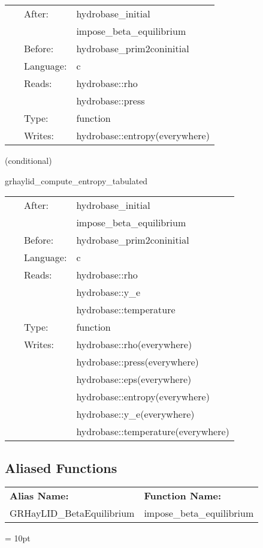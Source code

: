\hspace{5mm}{\it computes entropy from density and pressure using hybrid eos } 


\hspace{5mm}

 \begin{tabular*}{160mm}{cll} 
~ & After:  & hydrobase\_initial \\ 
~& ~ &impose\_beta\_equilibrium\\ 
~ & Before:  & hydrobase\_prim2coninitial \\ 
~ & Language:  & c \\ 
~ & Reads:  & hydrobase::rho \\ 
~& ~ &hydrobase::press\\ 
~ & Type:  & function \\ 
~ & Writes:  & hydrobase::entropy(everywhere) \\ 
\end{tabular*} 


\vspace{5mm}

   (conditional) 

\hspace{5mm} grhaylid\_compute\_entropy\_tabulated 

\hspace{5mm}{\it computes entropy from density, y\_e, and temperature using tabulated eos } 


\hspace{5mm}

 \begin{tabular*}{160mm}{cll} 
~ & After:  & hydrobase\_initial \\ 
~& ~ &impose\_beta\_equilibrium\\ 
~ & Before:  & hydrobase\_prim2coninitial \\ 
~ & Language:  & c \\ 
~ & Reads:  & hydrobase::rho \\ 
~& ~ &hydrobase::y\_e\\ 
~& ~ &hydrobase::temperature\\ 
~ & Type:  & function \\ 
~ & Writes:  & hydrobase::rho(everywhere) \\ 
~& ~ &hydrobase::press(everywhere)\\ 
~& ~ &hydrobase::eps(everywhere)\\ 
~& ~ &hydrobase::entropy(everywhere)\\ 
~& ~ &hydrobase::y\_e(everywhere)\\ 
~& ~ &hydrobase::temperature(everywhere)\\ 
\end{tabular*} 


\subsection*{Aliased Functions}

\hspace{5mm}

 \begin{tabular*}{160mm}{ll} 

{\bf Alias Name:} ~~~~~~~ & {\bf Function Name:} \\ 
GRHayLID\_BetaEquilibrium & impose\_beta\_equilibrium \\ 
\end{tabular*} 



\vspace{5mm}\parskip = 10pt 
